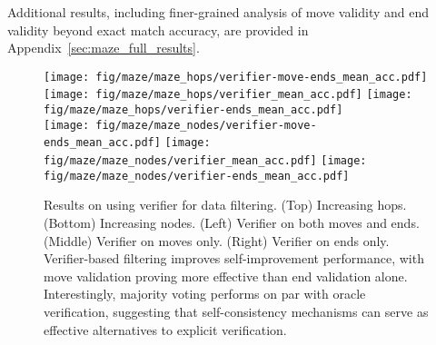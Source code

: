Additional results, including finer-grained analysis of move validity and end validity beyond exact match accuracy, are provided in Appendix~\ref{sec:maze_full_results}.

\begin{figure}
    \centering
    \texttt{[image: fig/maze/maze\_hops/verifier-move-ends\_mean\_acc.pdf]}
    \hspace{1mm}
    \texttt{[image: fig/maze/maze\_hops/verifier\_mean\_acc.pdf]}
    \hspace{1mm}
    \texttt{[image: fig/maze/maze\_hops/verifier-ends\_mean\_acc.pdf]}    
    \\
    \texttt{[image: fig/maze/maze\_nodes/verifier-move-ends\_mean\_acc.pdf]}
    \hspace{1mm}
    \texttt{[image: fig/maze/maze\_nodes/verifier\_mean\_acc.pdf]}
    \hspace{1mm}
    \texttt{[image: fig/maze/maze\_nodes/verifier-ends\_mean\_acc.pdf]}
    \caption{Results on using verifier for data filtering. (Top) Increasing hops. (Bottom) Increasing nodes. (Left) Verifier on both moves and ends. (Middle) Verifier on moves only. (Right) Verifier on ends only. Verifier-based filtering improves self-improvement performance, with move validation proving more effective than end validation alone. Interestingly, majority voting performs on par with oracle verification, suggesting that self-consistency mechanisms can serve as effective alternatives to explicit verification.}
    \label{fig:maze_verifier}
\end{figure}










